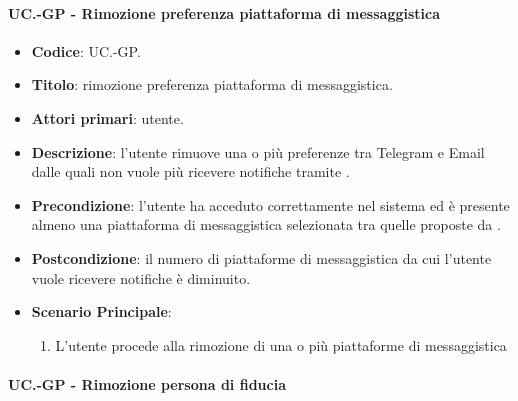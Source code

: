 	\paragraph{UC\theuccount.\thesubuccount-GP - Rimozione preferenza piattaforma di messaggistica}
	
	\begin{itemize}
		\item \textbf{Codice}: UC\theuccount.\thesubuccount-GP.
		\item \textbf{Titolo}: rimozione preferenza piattaforma di messaggistica.
		\item \textbf{Attori primari}: utente.
		\item \textbf{Descrizione}: l’utente rimuove una o più preferenze tra Telegram e Email dalle	quali non vuole più ricevere notifiche tramite \progetto.
		\item \textbf{Precondizione}: l’utente ha acceduto correttamente nel sistema ed è presente almeno una piattaforma di messaggistica selezionata tra quelle proposte da \progetto.
		\item \textbf{Postcondizione}: il numero di piattaforme di messaggistica da cui l’utente vuole ricevere notifiche è diminuito.
		\item \textbf{Scenario Principale}:
		\begin{enumerate}
			\item L'utente procede alla rimozione di una o più piattaforme di messaggistica
		\end{enumerate}
	\end{itemize}
	
	\paragraph{UC\theuccount.\thesubuccount-GP - Rimozione persona di fiducia}
	
